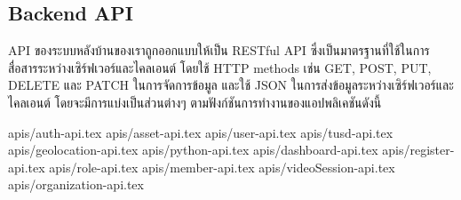 \subsection{ Backend API}

\ifenglish
\else
API ของระบบหลังบ้านของเราถูกออกแบบให้เป็น RESTful API ซึ่งเป็นมาตรฐานที่ใช้ในการสื่อสารระหว่างเซิร์ฟเวอร์และไคลเอนต์ โดยใช้ HTTP methods เช่น GET, POST, PUT, DELETE และ PATCH ในการจัดการข้อมูล และใช้ JSON ในการส่งข้อมูลระหว่างเซิร์ฟเวอร์และไคลเอนต์ โดยจะมีการแบ่งเป็นส่วนต่างๆ ตามฟังก์ชันการทำงานของแอปพลิเคชันดังนี้

{apis/auth-api.tex}
{apis/asset-api.tex}
{apis/user-api.tex}
{apis/tusd-api.tex}
{apis/geolocation-api.tex}
{apis/python-api.tex}
{apis/dashboard-api.tex}
{apis/register-api.tex}
{apis/role-api.tex}
{apis/member-api.tex}
{apis/videoSession-api.tex}
{apis/organization-api.tex}
\fi